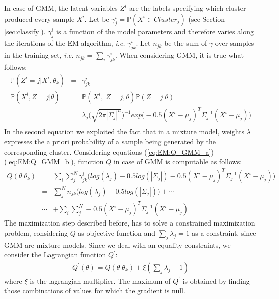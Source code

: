 \documentclass{article}
\begin{document}
In case of GMM, the latent variables $Z^i$ are the labels specifying which cluster produced every sample $X^i$. Let be $\gamma^{i}_j = \mathbb{P}(X^i \in Cluster_j)$ (see Section \ref{sec:classify}). $\gamma^{i}_j$ is a function of the model parameters and therefore varies along the iterations of the EM algorithm, \textit{i.e.} $\gamma^{i}_{jk}$. Let $n_{jk}$ be the sum of $\gamma$ over samples in the training set, \textit{i.e.} $n_{jk} = \sum_{i} \gamma^{i}_{jk}$.
When considering GMM, it is true what follows:
\begin{eqnarray}
\mathbb{P}(Z^i=j | X^i, \theta_k) &=& \gamma^{i}_{jk} 
\label{eq:EM:Q_GMM_a}\\
\mathbb{P}(X^i, Z=j| \theta) &=&  \mathbb{P}(X^i, | Z=j, \theta) \mathbb{P}(Z=j | \theta) \nonumber\\
&=& \lambda_j \bigg(\sqrt{2 \pi \left | \Sigma_j \right |^n}\bigg)^{-1} exp \bigg(-0.5 (X^i - \mu_j)^T \Sigma_j^{-1} (X^i - \mu_j) \bigg)  \nonumber\\
\label{eq:EM:Q_GMM_b}
\end{eqnarray}
In the second equation we exploited the fact that in a mixture model, weights $\lambda$ expresses the a priori probability of a sample being generated by the corresponding cluster.
Considering equations (\ref{eq:EM:Q_GMM_a}) (\ref{eq:EM:Q_GMM_b}), function $Q$ in case of GMM is computable as follows:
\begin{eqnarray}
Q(\theta | \theta_k) &=& \sum_{i} \sum_{j}^N \gamma^{i}_{jk} \bigg( log(\lambda_j) -0.5log( \left | \Sigma_j \right | ) -0.5 (X^i - \mu_j)^T \Sigma_j^{-1} (X^i - \mu_j) \bigg) \nonumber\\
 &=& \sum_{j}^N n_{jk} \bigg( 
log(\lambda_j) -0.5log( \left | \Sigma_j \right | )
\bigg) +  \cdots  \nonumber\\
 & \cdots & +  \sum_{i}  \sum_{j}^N
-0.5 (X^i - \mu_j)^T \Sigma_j^{-1} (X^i - \mu_j)
\end{eqnarray}
The maximization step described before, has to solve a constrained maximization problem, considering $Q$ as objective function and $\sum_j \lambda_j = 1$ as a constraint, since GMM are mixture models. Since we deal with an equality constraints, we consider the Lagrangian function $Q^{'}$:
\begin{eqnarray}
Q^{'}(\theta) = Q(\theta | \theta _k) + \xi (\sum_j \lambda_j - 1 )
\end{eqnarray}
where $\xi$ is the lagrangian multiplier. The maximum of $Q^{'}$ is obtained by finding those combinations of values for which the gradient is null.
\end{document}
